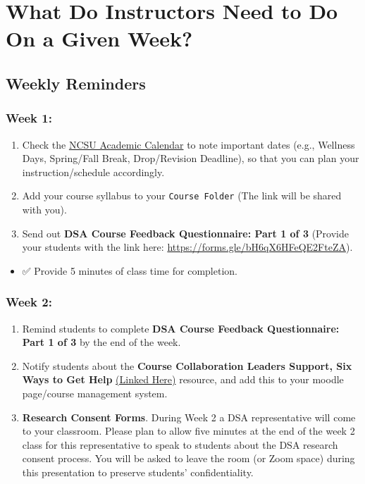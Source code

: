 \documentclass[
]{book}
\providecommand{\tightlist}{%
  \setlength{\itemsep}{0pt}\setlength{\parskip}{0pt}}
\begin{document}
\hfill\break

\chapter{What Do Instructors Need to Do On a Given Week?}\label{what-do-instructors-need-to-do-on-a-given-week}

\section{Weekly Reminders}\label{weekly-reminders}

\subsection{Week 1:}\label{week-1}

\begin{enumerate}
\def\labelenumi{\arabic{enumi})}
\item
  Check the \href{https://studentservices.ncsu.edu/calendars/academic/}{NCSU Academic Calendar} to note important dates (e.g., Wellness Days, Spring/Fall Break, Drop/Revision Deadline), so that you can plan your instruction/schedule accordingly.
\item
  Add your course syllabus to your \texttt{Course\ Folder} (The link will be shared with you).
\item
  Send out { \textbf{DSA Course Feedback Questionnaire: Part 1 of 3} } (Provide your students with the link here: \url{https://forms.gle/bH6qX6HFeQE2FteZA}).
\end{enumerate}

\begin{itemize}
\tightlist
\item
  ✅ Provide 5 minutes of class time for completion.
\end{itemize}

\subsection{Week 2:}\label{week-2}

\begin{enumerate}
\def\labelenumi{\arabic{enumi})}
\item
  Remind students to complete \textbf{DSA Course Feedback Questionnaire: Part 1 of 3} by the end of the week.
\item
  Notify students about the \textbf{Course Collaboration Leaders Support, Six Ways to Get Help} \href{https://docs.google.com/document/d/1HHNjCbm_W4CEdBWgecMDRpI64hqvmsZZ1Tq8qpudjWo/edit?usp=sharing}{(Linked Here)} resource, and add this to your moodle page/course management system.
\item
  \textbf{Research Consent Forms}. During Week 2 a DSA representative will come to your classroom. Please plan to allow five minutes at the end of the week 2 class for this representative to speak to students about the DSA research consent process. You will be asked to leave the room (or Zoom space) during this presentation to preserve students' confidentiality.
\end{enumerate}
\end{document}
